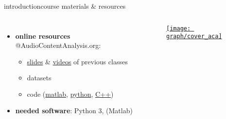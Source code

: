 \begin{frame}{introduction}{course materials \& resources}
\begin{columns}[T]
\begin{itemize}
                        \smallskip
                        \item<3->   \textbf{online resources} @AudioContentAnalysis.org: 
                            \begin{itemize}
                                \item   \href{https://github.com/alexanderlerch/ACA-Slides}{slides} \& \href{https://www.AudioContentAnalysis.org/class}{videos} of previous classes
                                \item   datasets
                                \item   code (\href{https://github.com/alexanderlerch/ACA-Code}{matlab}, \href{https://github.com/alexanderlerch/pyACA}{python}, \href{https://github.com/alexanderlerch/libACA}{C++})
                            \end{itemize}
                        \smallskip
                        \item<4->   \textbf{needed software}: Python 3, (Matlab)
                    \end{itemize}
                     \href{https://ieeexplore.ieee.org/servlet/opac?bknumber=6266785}{\texttt{[image: graph/cover\_aca]}}
                    \vspace{40mm}
             \end{columns}
       \end{frame}

